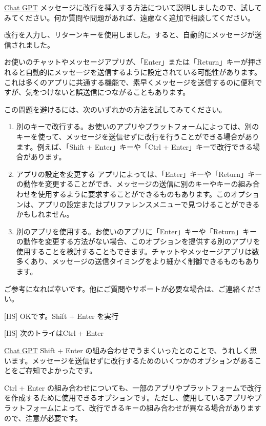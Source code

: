 \documentclass[
]{book}
\theoremstyle{definition}
\theoremstyle{definition}
\theoremstyle{definition}
\theoremstyle{definition}
\theoremstyle{remark}
\begin{document}
\protect\hyperlink{chatgpt}{Chat GPT} メッセージに改行を挿入する方法について説明しましたので、試してみてください。何か質問や問題があれば、遠慮なく追加で相談してください。

改行を入力し、リターンキーを使用しました。すると、自動的にメッセージが送信されました。

お使いのチャットやメッセージアプリが、「Enter」または「Return」キーが押されると自動的にメッセージを送信するように設定されている可能性があります。これは多くのアプリに共通する機能で、素早くメッセージを送信するのに便利ですが、気をつけないと誤送信につながることもあります。

この問題を避けるには、次のいずれかの方法を試してみてください。

\begin{enumerate}
\def\labelenumi{\arabic{enumi}.}
\item
  別のキーで改行する。お使いのアプリやプラットフォームによっては、別のキーを使って、メッセージを送信せずに改行を行うことができる場合があります。例えば、「Shift + Enter」キーや「Ctrl + Enter」キーで改行できる場合があります。
\item
  アプリの設定を変更する アプリによっては、「Enter」キーや「Return」キーの動作を変更することができ、メッセージの送信に別のキーやキーの組み合わせを使用するように要求することができるものもあります。このオプションは、アプリの設定またはプリファレンスメニューで見つけることができるかもしれません。
\item
  別のアプリを使用する。お使いのアプリに「Enter」キーや「Return」キーの動作を変更する方法がない場合、このオプションを提供する別のアプリを使用することを検討することもできます。チャットやメッセージアプリは数多くあり、メッセージの送信タイミングをより細かく制御できるものもあります。
\end{enumerate}

ご参考になれば幸いです。他にご質問やサポートが必要な場合は、ご連絡ください。

{[}HS{]} OKです。Shift + Enter を実行

{[}HS{]} 次のトライはCtrl + Enter

\protect\hyperlink{chatgpt}{Chat GPT} Shift + Enter の組み合わせでうまくいったとのことで、うれしく思います。メッセージを送信せずに改行するためのいくつかのオプションがあることをご存知でよかったです。

Ctrl + Enter の組み合わせについても、一部のアプリやプラットフォームで改行を作成するために使用できるオプションです。ただし、使用しているアプリやプラットフォームによって、改行できるキーの組み合わせが異なる場合がありますので、注意が必要です。
\end{document}

